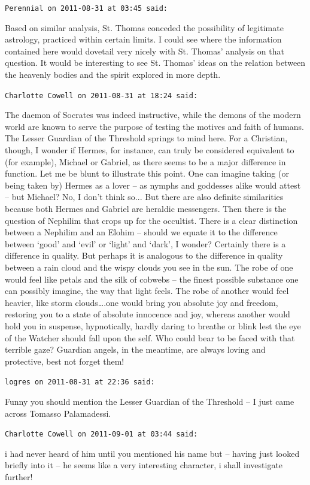 \begin{footnotesize}\begin{sffamily}

\texttt{Perennial on 2011-08-31 at 03:45 said: }

Based on similar analysis, St. Thomas conceded the possibility of legitimate astrology, practiced within certain limits. I could see where the information contained here would dovetail very nicely with St. Thomas' analysis on that question. It would be interesting to see St. Thomas' ideas on the relation between the heavenly bodies and the spirit explored in more depth.

\hfill

\texttt{Charlotte Cowell on 2011-08-31 at 18:24 said: }

The daemon of Socrates was indeed instructive, while the demons of the modern world are known to serve the purpose of testing the motives and faith of humans. The Lesser Guardian of the Threshold springs to mind here. For a Christian, though, I wonder if Hermes, for instance, can truly be considered equivalent to (for example), Michael or Gabriel, as there seems to be a major difference in function. Let me be blunt to illustrate this point. One can imagine taking (or being taken by) Hermes as a lover – as nymphs and goddesses alike would attest – but Michael? No, I don't think so... But there are also definite similarities because both Hermes and Gabriel are heraldic messengers. Then there is the question of Nephilim that crops up for the occultist. There is a clear distinction between a Nephilim and an Elohim – should we equate it to the difference between ‘good' and ‘evil' or ‘light' and `dark’, I wonder? Certainly there is a difference in quality. But perhaps it is analogous to the difference in quality between a rain cloud and the wispy clouds you see in the sun. The robe of one would feel like petals and the silk of cobwebs – the finest possible substance one can possibly imagine, the way that light feels. The robe of another would feel heavier, like storm clouds….one would bring you absolute joy and freedom, restoring you to a state of absolute innocence and joy, whereas another would hold you in suspense, hypnotically, hardly daring to breathe or blink lest the eye of the Watcher should fall upon the self. Who could bear to be faced with that terrible gaze? Guardian angels, in the meantime, are always loving and protective, best not forget them!

\hfill

\texttt{logres on 2011-08-31 at 22:36 said: }

Funny you should mention the Lesser Guardian of the Threshold – I just came across Tomasso Palamadessi.


\hfill

\texttt{Charlotte Cowell on 2011-09-01 at 03:44 said: }

i had never heard of him until you mentioned his name but – having just looked briefly into it – he seems like a very interesting character, i shall investigate further!

\hfill
\end{sffamily}\end{footnotesize}